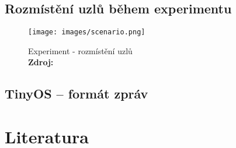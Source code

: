\documentclass[11pt,final,twoside]{fithesis2}
\newcommand*{\captionsource}[2]{%
  \caption[{#1}]{%
    #1%
    \\\hspace{\linewidth}%
    \textbf{Zdroj:} #2%
  }%
}
\begin{document}
\section{Rozmístění uzlů během experimentu}
\begin{figure}[h]
     \centering
     \texttt{[image: images/scenario.png]}
     \captionsource{Experiment - rozmístění uzlů}{\cite{Svenda2014}}
     \label{img:scenario}
\end{figure}

\section{TinyOS -- formát zpráv} \label{sec:msg}



\begingroup
\def\tmpchapter{0}
\renewcommand{\chaptername}{}
\renewcommand{\thechapter}{}
\chapter{Literatura}
\renewcommand{\chapter}[2]{}%




\endgroup



\end{document}
